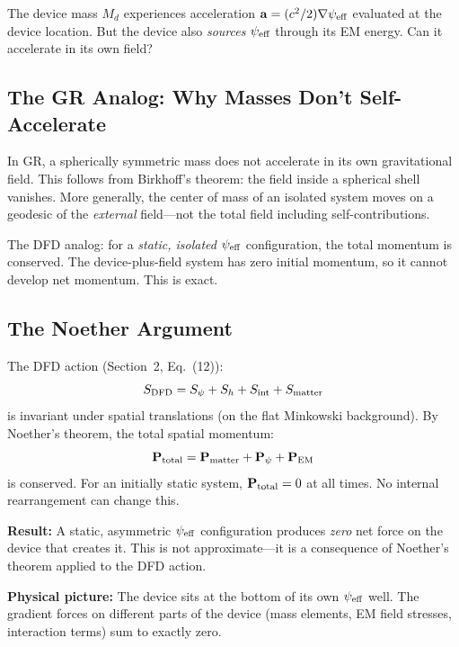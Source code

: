 \documentclass[11pt]{article}
\newcommand{\psieff}{\psi_{\rm eff}}
\newcommand{\avec}{\mathbf{a}}
\begin{document}
The device mass $M_d$ experiences acceleration $\avec = (c^2/2)\nabla\psieff$
evaluated at the device location. But the device also \emph{sources}
$\psieff$ through its EM energy. Can it accelerate in its own field?

\subsection{The GR Analog: Why Masses Don't Self-Accelerate}

In GR, a spherically symmetric mass does not accelerate in its own
gravitational field. This follows from Birkhoff's theorem: the field
inside a spherical shell vanishes. More generally, the center of mass
of an isolated system moves on a geodesic of the \emph{external}
field---not the total field including self-contributions.

The DFD analog: for a \emph{static, isolated} $\psieff$ configuration,
the total momentum is conserved. The device-plus-field system has zero
initial momentum, so it cannot develop net momentum. This is exact.

\subsection{The Noether Argument}

The DFD action (Section~2, Eq.~(12)):
\begin{equation}
S_{\rm DFD} = S_\psi + S_h + S_{\rm int} + S_{\rm matter}
\end{equation}
is invariant under spatial translations (on the flat Minkowski
background). By Noether's theorem, the total spatial momentum:
\begin{equation}
\mathbf{P}_{\rm total} = \mathbf{P}_{\rm matter} + \mathbf{P}_\psi
+ \mathbf{P}_{\rm EM}
\end{equation}
is conserved. For an initially static system, $\mathbf{P}_{\rm total} = 0$
at all times. No internal rearrangement can change this.

\begin{tcolorbox}[colback=red!5!white, colframe=red!60!black,
  title=Static Self-Force: Exact Cancellation]
\textbf{Result:} A static, asymmetric $\psieff$ configuration produces
\emph{zero} net force on the device that creates it. This is not
approximate---it is a consequence of Noether's theorem applied to the
DFD action.

\textbf{Physical picture:} The device sits at the bottom of its own
$\psieff$ well. The gradient forces on different parts of the device
(mass elements, EM field stresses, interaction terms) sum to exactly
zero.
\end{tcolorbox}
\end{document}
